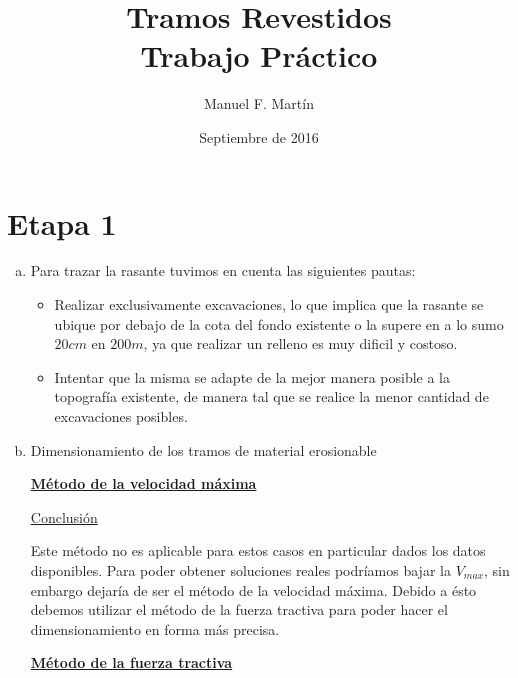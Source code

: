 \documentclass[10.5pt]{article}
\begin{document}
\date{Septiembre de 2016}
\title{Tramos Revestidos\\Trabajo Práctico}
\author{Manuel F. Martín}

\maketitle


\section*{Etapa 1}

\begin{enumerate}[a)]
 \item Para trazar la rasante tuvimos en cuenta las siguientes pautas:
  \begin{itemize}
   \item Realizar exclusivamente excavaciones, lo que implica que la rasante se ubique por debajo de la cota del fondo existente o la supere
   en a lo sumo $20 cm$ en $200 m$, ya que realizar un relleno es muy dificil y costoso.
   \item Intentar que la misma se adapte de la mejor manera posible a la topografía existente, de manera tal que se realice la menor cantidad
   de excavaciones posibles.
  \end{itemize}
 \item Dimensionamiento de los tramos de material erosionable
 
 \underline{\bf Método de la velocidad máxima}
 
 
 
 
 
 \underline{Conclusión}
 
 Este método no es aplicable para estos casos en particular dados los datos disponibles.
 Para poder obtener soluciones reales podríamos bajar la $V_{max}$, sin embargo dejaría de ser el método de la velocidad máxima.
 Debido a ésto debemos utilizar el método de la fuerza tractiva para poder hacer el dimensionamiento en forma más precisa.

 \underline{\bf Método de la fuerza tractiva}
 
 
 
 
 
\end{enumerate}
\end{document}

